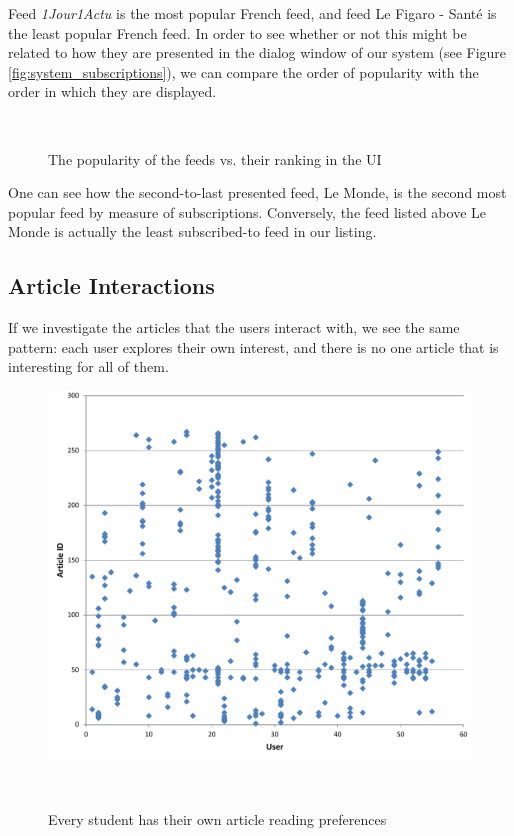 Feed {\em 1Jour1Actu} is the most popular French feed, and feed Le Figaro - Sant\'e is the least popular French feed. In order to see whether or not this might be related to how they are presented in the dialog window of our system (see Figure \ref{fig:system_subscriptions}), we can compare the order of popularity with the order in which they are displayed.

\begin{figure}[h!]
\centering
  
  \caption{The popularity of the feeds vs. their ranking in the UI}~\label{fig:registrations}
\end{figure}

One can see how the second-to-last presented feed, Le Monde, is the second most popular feed by measure of subscriptions. Conversely, the feed listed above Le Monde is actually the least subscribed-to feed in our listing.

\subsection{Article Interactions}
If we investigate the articles that the users interact with, we see the same pattern: each user explores their own interest, and there is no one article that is interesting for all of them. 

\begin{figure}[h!]
\centering
  \includegraphics[width=\columnwidth]{figures/users_articles}
  \caption{Every student has their own article reading preferences}~\label{fig:registrations}
\end{figure}



